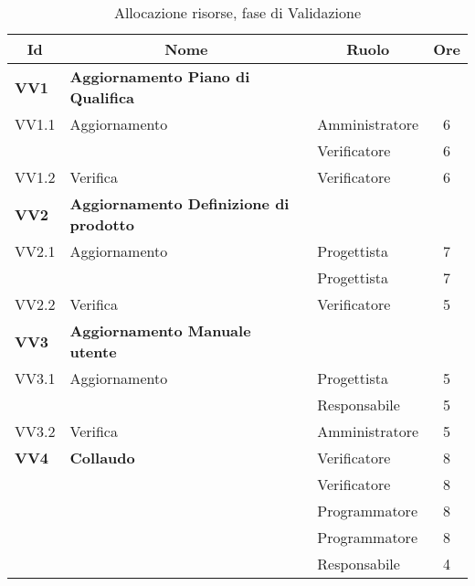 \begin{table}[H]
\begin{adjustwidth}{-4cm}{-4cm}
	\centering
	\begin{tabular}{ l l l c  }
	\hline
	\multicolumn{1}{c}{\textbf{Id}} & 
	\multicolumn{1}{c}{\textbf{Nome}} & 
	\multicolumn{1}{c}{\textbf{Ruolo}}& 
	\multicolumn{1}{c}{\textbf{Ore}} \\
	\hline
	\textbf{VV1} & \textbf{Aggiornamento Piano di Qualifica} \\
	\cline{3-4}
	VV1.1 & Aggiornamento  & Amministratore & 6\\ 
	 & & Verificatore & 6\\
    \cline{3-4}
	VV1.2 & Verifica & Verificatore &  6\\
	\hline
	\textbf{VV2} & \textbf{Aggiornamento Definizione di prodotto} \\
	\cline{3-4}
	VV2.1 & Aggiornamento  & Progettista & 7\\ 
	 & & Progettista & 7\\
    \cline{3-4}
	VV2.2 & Verifica & Verificatore &  5\\
	\hline
	\textbf{VV3} & \textbf{Aggiornamento Manuale utente} \\
	\cline{3-4}
	VV3.1 & Aggiornamento  & Progettista & 5\\ 
	 & & Responsabile & 5\\
    \cline{3-4}
	VV3.2 & Verifica & Amministratore &  5\\
	\hline
	\textbf{VV4} & \textbf{Collaudo} & Verificatore & 8\\
	 & & Verificatore & 8\\
	 & & Programmatore & 8\\
	 & & Programmatore & 8\\
	 & & Responsabile & 4\\
	\hline
	\end{tabular}
	\caption{Allocazione risorse, fase di Validazione}
\end{adjustwidth}
\end{table}	
	
	
